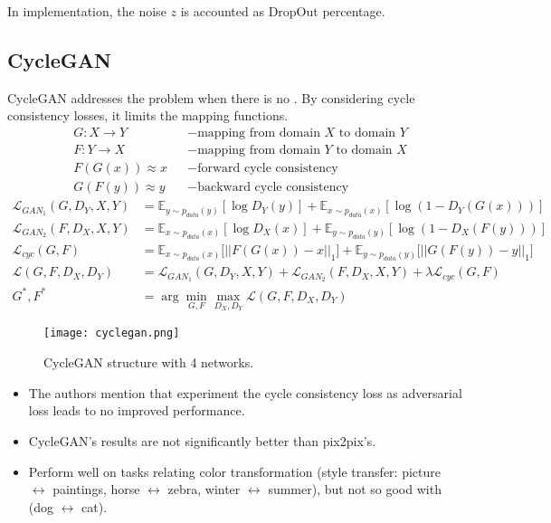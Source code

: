 \note In implementation, the noise $z$ is accounted as DropOut percentage.

\subsection{CycleGAN}
Cycle\ac{GAN} addresses the problem when there is no . By considering cycle consistency losses, it limits the mapping functions. \cite{zhu2017unpaired}
\begin{align}
	&G: X \rightarrow Y &&-\text{mapping from domain $X$ to domain $Y$}\\
	&F: Y \rightarrow X &&-\text{mapping from domain $Y$ to domain $X$}\\
	&F(G(x)) \approx x &&-\text{forward cycle consistency}\\
	&G(F(y)) \approx y &&-\text{backward cycle consistency}
\end{align}
\begin{align}
	\mathcal{L}_{GAN_1} (G, D_Y, X, Y) &= \mathbb{E}_{y \sim p_{data}(y)}[\log D_Y(y)] + \mathbb{E}_{x \sim p_{data}(x)} [\log (1 - D_Y(G(x)))]\\
	\mathcal{L}_{GAN_2} (F, D_X, X, Y) &= \mathbb{E}_{x \sim p_{data}(x)}[\log D_X(x)] + \mathbb{E}_{y \sim p_{data}(y)} [\log (1 - D_X(F(y)))]\\
	\mathcal{L}_{cyc}(G,F) &= \mathbb{E}_{x \sim p_{data}(x)}\big[||F(G(x))-x||_1 \big] + \mathbb{E}_{y \sim p_{data}(y)} \big[||G(F(y))-y||_1\big]\\
	\mathcal{L}(G, F, D_X, D_Y) &= \mathcal{L}_{GAN_1} (G, D_Y, X, Y) + \mathcal{L}_{GAN_2} (F, D_X, X, Y) + \lambda \mathcal{L}_{cyc}(G,F)\\
	G^*, F^* &= \arg\underset{G, F}{\min}\underset{D_X, D_Y}{\max} \mathcal{L}(G, F, D_X, D_Y)
\end{align}
\begin{figure}[hbt!]
	\centering
	\texttt{[image: cyclegan.png]}
	\caption{Cycle\ac{GAN} structure with 4 networks. \cite{zhu2017unpaired}}
\end{figure}

\note
\begin{itemize}
	\item The authors mention that experiment the cycle consistency loss as adversarial loss leads to no improved performance.
	\item Cycle\ac{GAN}'s results are not significantly better than pix2pix's.
	\item Perform well on tasks relating color transformation (\eg style transfer: picture $\leftrightarrow$ paintings, horse $\leftrightarrow$ zebra, winter $\leftrightarrow$ summer), but not so good with  (dog $\leftrightarrow$ cat).
\end{itemize}
